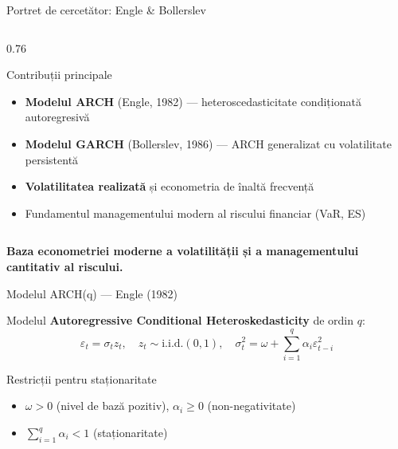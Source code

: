 \documentclass[9pt, aspectratio=169, t]{beamer}
\begin{document}
\begin{frame}{Portret de cercetător: Engle \& Bollerslev}
\begin{columns}[T]
\begin{column}{0.76\textwidth}
\begin{exampleblock}{Contribuții principale}
                \begin{itemize}
                    \item \textbf{Modelul ARCH} (Engle, 1982) --- heteroscedasticitate condiționată autoregresivă
                    \item \textbf{Modelul GARCH} (Bollerslev, 1986) --- ARCH generalizat cu volatilitate persistentă
                    \item \textbf{Volatilitatea realizată} și econometria de înaltă frecvență
                    \item Fundamentul managementului modern al riscului financiar (VaR, ES)
                \end{itemize}
            \end{exampleblock}
        \end{column}
    \end{columns}
    \vspace{-0.2cm}
    \begin{center}
        {\textcolor{MainBlue}{\textbf{Baza econometriei moderne a volatilității și a managementului cantitativ al riscului.}}}
    \end{center}
\end{frame}

\begin{frame}{Modelul ARCH(q) --- Engle (1982)}
    \small
        \begin{defn}[ARCH(q)]
            Modelul \textbf{Autoregressive Conditional Heteroskedasticity} de ordin $q$:
            \[
                \varepsilon_t = \sigma_t z_t, \quad z_t \sim \text{i.i.d.}(0, 1), \quad
                \sigma_t^2 = \omega + \sum_{i=1}^{q} \alpha_i \varepsilon_{t-i}^2
            \]
        \end{defn}

        \vspace{0.2cm}

        \begin{block}{Restricții pentru staționaritate}
            \begin{itemize}
                \item $\omega > 0$ (nivel de bază pozitiv), \quad $\alpha_i \geq 0$ (non-negativitate)
                \item $\sum_{i=1}^{q} \alpha_i < 1$ (staționaritate)
            \end{itemize}
        \end{block}
\end{frame}
\end{document}
